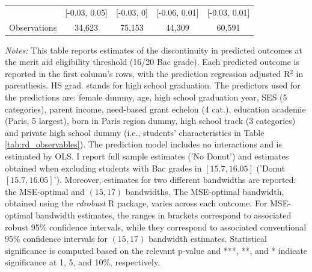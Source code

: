 \begin{table}[H]
{\begin{threeparttable}
\begin{tabular}[t]{lcccc}
 & {}[-0.03, 0.05] & {}[-0.03, 0] & {}[-0.06, 0.01] & {}[-0.03, 0.01]\\
\addlinespace[0.3em]\hline\addlinespace[0.3em]
Observations & 34,623 & 75,153 & 44,309 & 60,591\\
\bottomrule
\end{tabular}
\begin{tablenotes}[para]
\item \textit{Notes:} This table reports estimates of the discontinuity in predicted outcomes at the merit aid eligibility threshold (16/20 Bac grade). Each predicted outcome is reported in the first column's rows, with the prediction regression adjusted R$^2$ in parenthesis. HS grad. stands for high school graduation. The predictors used for the predictions are: female dummy, age, high school graduation year, SES (5 categories), parent income, need-based grant echelon (4 cat.), education academie (Paris, 5 largest), born in Paris region dummy, high school track (3 categories) and private high school dummy (i.e., students' characteristics in Table \ref{tab:rd_observables}). The prediction model includes no interactions and is estimated by OLS. I report full sample estimates ('No Donut') and estimates obtained when excluding students with Bac grades in $[15.7, 16.05]$ ('Donut $[15.7, 16.05]$'). Moreover, estimates for two different bandwidths are reported: the MSE-optimal and $(15, 17)$ bandwidths. The MSE-optimal bandwidth, obtained using the \textit{rdrobust} R package, varies across each outcome. For MSE-optimal bandwidth estimates, the ranges in brackets correspond to associated robust 95\% confidence intervals, while they correspond to associated conventional 95\% confidence intervals for $(15, 17)$ bandwidth estimates. Statistical significance is computed based on the relevant p-value and ***, **, and * indicate significance at 1, 5, and 10\%, respectively.
\end{tablenotes}
\end{threeparttable}}
\end{table}
